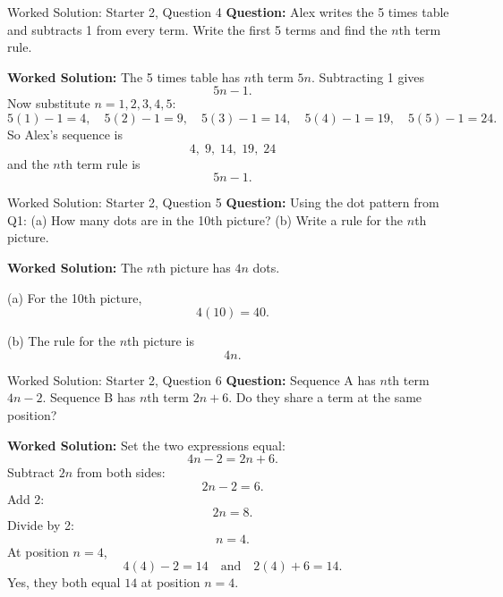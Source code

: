 \documentclass{beamer}
\begin{document}
\begin{frame}{Worked Solution: Starter 2, Question 4}
\textbf{Question:} Alex writes the 5 times table and subtracts 1 from every term. Write the first 5 terms and find the $n$th term rule.

\textbf{Worked Solution:} The 5 times table has $n$th term $5n$. Subtracting 1 gives
\[
5n-1.
\]
Now substitute $n=1,2,3,4,5$:
\[
5(1)-1=4,\quad 5(2)-1=9,\quad 5(3)-1=14,\quad 5(4)-1=19,\quad 5(5)-1=24.
\]
So Alex's sequence is
\[
4,\;9,\;14,\;19,\;24
\]
and the $n$th term rule is
\[
5n-1.
\]
\end{frame}

\begin{frame}{Worked Solution: Starter 2, Question 5}
\textbf{Question:} Using the dot pattern from Q1: (a) How many dots are in the 10th picture? (b) Write a rule for the $n$th picture.

\textbf{Worked Solution:} The $n$th picture has $4n$ dots.

(a) For the 10th picture,
\[
4(10)=40.
\]

(b) The rule for the $n$th picture is
\[
4n.
\]
\end{frame}

\begin{frame}{Worked Solution: Starter 2, Question 6}
\textbf{Question:} Sequence A has $n$th term $4n-2$. Sequence B has $n$th term $2n+6$. Do they share a term at the same position?

\textbf{Worked Solution:} Set the two expressions equal:
\[
4n-2=2n+6.
\]
Subtract $2n$ from both sides:
\[
2n-2=6.
\]
Add 2:
\[
2n=8.
\]
Divide by 2:
\[
n=4.
\]
At position $n=4$,
\[
4(4)-2=14 \quad\text{and}\quad 2(4)+6=14.
\]
Yes, they both equal $14$ at position $n=4$.
\end{frame}
\end{document}
